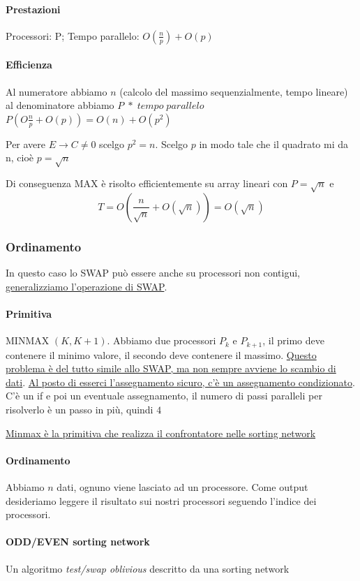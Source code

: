 \paragraph{Prestazioni} Processori: P; Tempo parallelo: $O(\frac{n}{p}) + O(p)$

\paragraph{Efficienza}
Al numeratore abbiamo $n$ (calcolo del massimo sequenzialmente, tempo lineare) al denominatore abbiamo $P\;*\;tempo\;parallelo$ $P(O\frac{n}{p} + O(p)) = O(n) + O(p^2)$

Per avere $E \rightarrow C \neq 0$ scelgo $p^2 = n$. Scelgo $p$ in modo tale che il quadrato mi da n, cioè $p = \sqrt{n}$

Di conseguenza MAX è risolto efficientemente su array lineari con $P=\sqrt{n}$ e 
$$T=O(\frac{n}{\sqrt{n}} + O(\sqrt{n})) = O(\sqrt{n})$$


\subsubsection{Ordinamento}
In questo caso lo SWAP può essere anche su processori non contigui, \uline{generalizziamo l'operazione di SWAP}.

\paragraph{Primitiva}
MINMAX $(K, K+1)$. Abbiamo due processori $P_k$ e $P_{k+1}$, il primo deve contenere il minimo valore, il secondo deve contenere il massimo. \uline{Questo problema è del tutto simile allo SWAP, ma non sempre avviene lo scambio di dati}. \uline{Al posto di esserci l'assegnamento sicuro, c'è un assegnamento condizionato}. C'è un if e poi un eventuale assegnamento, il numero di passi paralleli per risolverlo è un passo in più, quindi $4$

\uline{Minmax è la primitiva che realizza il confrontatore nelle sorting network}

\paragraph{Ordinamento}
Abbiamo $n$ dati, ognuno viene lasciato ad un processore. Come output desideriamo leggere il risultato sui nostri processori seguendo l'indice dei processori.

\paragraph{ODD/EVEN sorting network} Un algoritmo \textit{test/swap oblivious} descritto da una sorting network

